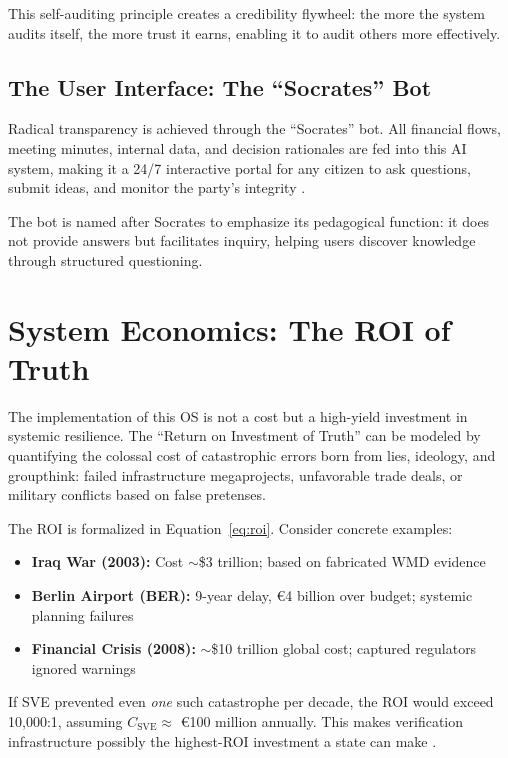 \documentclass[11pt,a4paper]{article}
\begin{document}
\begin{small}
This self-auditing principle creates a credibility flywheel: the more the system audits itself, the more trust it earns, enabling it to audit others more effectively.

\subsection{The User Interface: The ``Socrates'' Bot}
Radical transparency is achieved through the ``Socrates'' bot. All financial flows, meeting minutes, internal data, and decision rationales are fed into this AI system, making it a 24/7 interactive portal for any citizen to ask questions, submit ideas, and monitor the party's integrity \citep[lines 3423--3424]{AnalyticalReport2025}.

The bot is named after Socrates to emphasize its pedagogical function: it does not provide answers but facilitates inquiry, helping users discover knowledge through structured questioning.

\section{System Economics: The ROI of Truth}
The implementation of this OS is not a cost but a high-yield investment in systemic resilience. The ``Return on Investment of Truth'' can be modeled by quantifying the colossal cost of catastrophic errors born from lies, ideology, and groupthink: failed infrastructure megaprojects, unfavorable trade deals, or military conflicts based on false pretenses.

The ROI is formalized in Equation~\eqref{eq:roi}. Consider concrete examples:
\begin{itemize}[nosep]
    \item \textbf{Iraq War (2003):} Cost $\sim$\$3 trillion; based on fabricated WMD evidence
    \item \textbf{Berlin Airport (BER):} 9-year delay, €4 billion over budget; systemic planning failures
    \item \textbf{Financial Crisis (2008):} $\sim$\$10 trillion global cost; captured regulators ignored warnings
\end{itemize}

If SVE prevented even \textit{one} such catastrophe per decade, the ROI would exceed 10,000:1, assuming $C_{\text{SVE}} \approx$ €100 million annually. This makes verification infrastructure possibly the highest-ROI investment a state can make \citep[lines 1514--1516, 1903--1906, 2140--2142, 3446--3448]{AnalyticalReport2025}.


\end{small}
\end{document}
